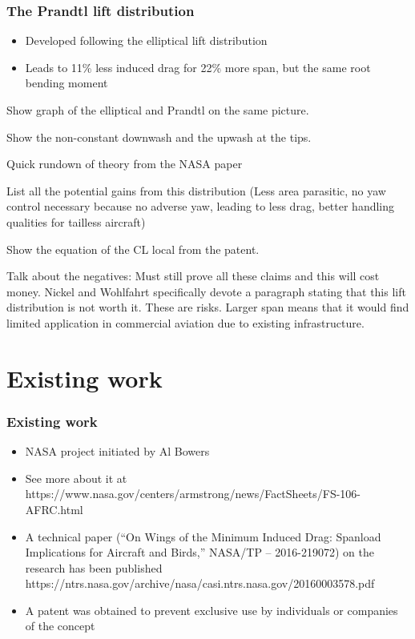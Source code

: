 \documentclass{beamer}
\begin{document}
\begin{frame}
\frametitle{The Prandtl lift distribution}
\begin{itemize}
\item Developed following the elliptical lift distribution
\item Leads to 11\% less induced drag for 22\% more span, but the same root bending moment
\end{itemize}


Show graph of the elliptical and Prandtl on the same picture.

Show the non-constant downwash and the upwash at the tips.

Quick rundown of theory from the NASA paper


List all the potential gains from this distribution (Less area parasitic, no yaw control necessary because no adverse yaw, leading to less drag, better handling qualities for tailless aircraft)

Show the equation of the CL local from the patent.

Talk about the negatives:  Must still prove all these claims and this will cost money.
Nickel and Wohlfahrt specifically devote a paragraph stating that this lift distribution is not worth it.  These are risks.
Larger span means that it would find limited application in commercial aviation due to existing infrastructure.


\end{frame}


\section{Existing work}


\begin{frame}
\frametitle{Existing work}
\begin{itemize}
\item NASA project initiated by Al Bowers
\item See more about it at https://www.nasa.gov/centers/armstrong/news/FactSheets/FS-106-AFRC.html
\item A technical paper (“On Wings of the Minimum Induced Drag: Spanload Implications for Aircraft and Birds,” NASA/TP – 2016-219072) on the research has been published
https://ntrs.nasa.gov/archive/nasa/casi.ntrs.nasa.gov/20160003578.pdf
\item A patent was obtained to prevent exclusive use by individuals or companies of the concept
\end{itemize}
\end{frame}
\end{document}
